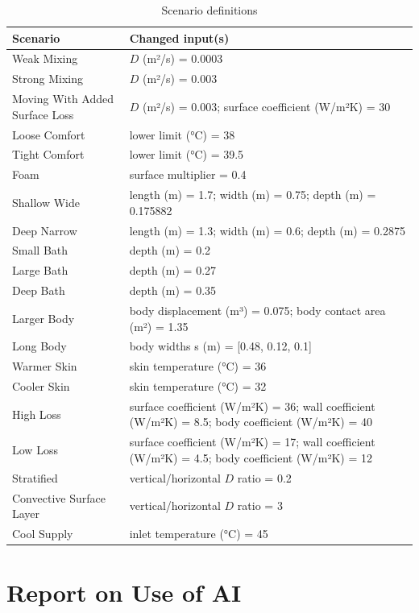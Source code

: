 \documentclass[12pt,a4paper]{article}
\begin{document}
\begin{table}[ht]\centering\normalsize\caption{Scenario definitions}\label{tab:12}
\begin{tabular}{@{}>{\raggedright\arraybackslash}p{0.3077\dimexpr\linewidth-2\tabcolsep\relax}>{\raggedright\arraybackslash}p{0.6923\dimexpr\linewidth-2\tabcolsep\relax}@{}}
\toprule
Scenario & Changed input(s) \\ \midrule
Weak Mixing & $D$ (m²/s) = 0.0003 \\
Strong Mixing & $D$ (m²/s) = 0.003 \\
Moving With Added Surface Loss & $D$ (m²/s) = 0.003; surface coefficient (W/m²K) = 30 \\
Loose Comfort & lower limit (°C) = 38 \\
Tight Comfort & lower limit (°C) = 39.5 \\
Foam & surface multiplier = 0.4 \\
Shallow Wide & length (m) = 1.7; width (m) = 0.75; depth (m) = 0.175882 \\
Deep Narrow & length (m) = 1.3; width (m) = 0.6; depth (m) = 0.2875 \\
Small Bath & depth (m) = 0.2 \\
Large Bath & depth (m) = 0.27 \\
Deep Bath & depth (m) = 0.35 \\
Larger Body & body displacement (m³) = 0.075; body contact area (m²) = 1.35 \\
Long Body & body widths s (m) = [0.48, 0.12, 0.1] \\
Warmer Skin & skin temperature (°C) = 36 \\
Cooler Skin & skin temperature (°C) = 32 \\
High Loss & surface coefficient (W/m²K) = 36; wall coefficient (W/m²K) = 8.5; body coefficient (W/m²K) = 40 \\
Low Loss & surface coefficient (W/m²K) = 17; wall coefficient (W/m²K) = 4.5; body coefficient (W/m²K) = 12 \\
Stratified & vertical/horizontal $D$ ratio = 0.2 \\
Convective Surface Layer & vertical/horizontal $D$ ratio = 3 \\
Cool Supply & inlet temperature (°C) = 45 \\ \bottomrule
\end{tabular}
\end{table}
\clearpage
\section*{Report on Use of AI}
\end{document}
